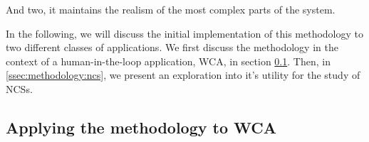 And two, it maintains the realism of the most complex parts of the system.


In the following, we will discuss the initial implementation of this methodology to two different classes of applications.
We first discuss the methodology in the context of a human-in-the-loop application, \gls{WCA}, in section \cref{ssec:methodology:wca}.
Then, in \cref{ssec:methodology:ncs}, we present an exploration into it's utility for the study of \glspl{NCS}.


\subsection{Applying the methodology to \acs{WCA}}\label{ssec:methodology:wca}

